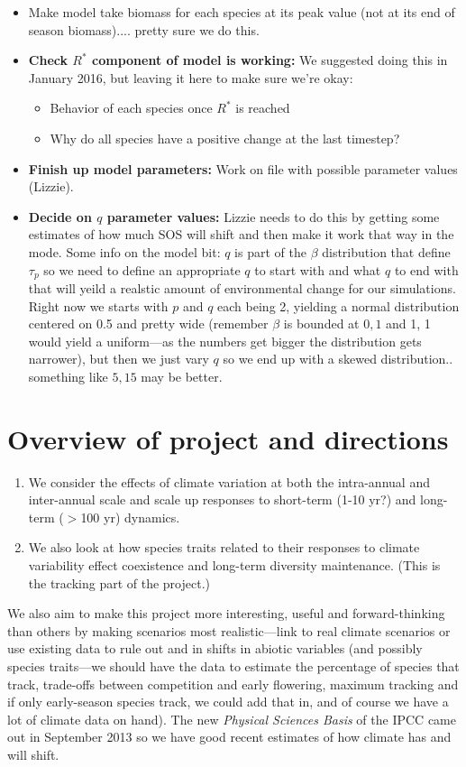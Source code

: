 \documentclass[11pt,a4paper,oneside]{article}
\begin{document}
\begin{itemize}
\item Make model take biomass for each species at its peak value (not at its end of season biomass).... pretty sure we do this.
\item {\bf Check $R^{*}$ component of model is working:} We suggested doing this in January 2016, but leaving it here to make sure we're okay:
\begin{itemize}
\item Behavior of each species once $R^{*}$ is reached
\item Why do all species have a positive change at the last timestep?
\end{itemize}
\item {\bf Finish up model parameters:} Work on file with possible parameter values (Lizzie). 
\item {\bf Decide on $q$ parameter values:}
Lizzie needs to do this by getting some estimates of how much SOS will shift and then make it work that way in the mode. Some info on the model bit: $q$ is part of the $\beta$ distribution that define $\tau_{p}$ so we need to define an appropriate $q$ to start with and what $q$ to end with that will yeild a realstic amount of environmental change for our simulations. Right now we starts with $p$ and $q$ each being 2, yielding a normal distribution centered on 0.5 and pretty wide (remember $\beta$ is bounded at $0,1$ and 1, 1 would yield a uniform---as the numbers get bigger the distribution gets narrower), but then we just vary $q$ so we end up with a skewed distribution.. something like $5,15$ may be better.
\end{itemize}

\newpage
\section{Overview of project and directions}
\noindent 
\begin{enumerate}
\item We consider the effects of climate variation at both the
intra-annual and inter-annual scale and scale up responses to
short-term (1-10 yr?) and long-term (\(>\)100 yr) dynamics. 
\item We also look at how species traits related to their responses to
  climate variability effect coexistence and long-term diversity
  maintenance. (This is the tracking part of the project.) 
\end{enumerate}

\noindent We also aim to make  this project more
interesting, useful and forward-thinking than others by making
scenarios most realistic---link to real climate scenarios or use
existing data to rule out and in shifts in abiotic variables (and
possibly species traits---we should have the data to estimate the
percentage of species that track, trade-offs between competition and early flowering, maximum tracking and if only
early-season species track, we could add that in, and of course we
have a lot of climate data on hand). The new \emph{Physical Sciences Basis} of the IPCC came out in September 2013 so we have good recent estimates of how climate has and will shift.\\
\end{document}
